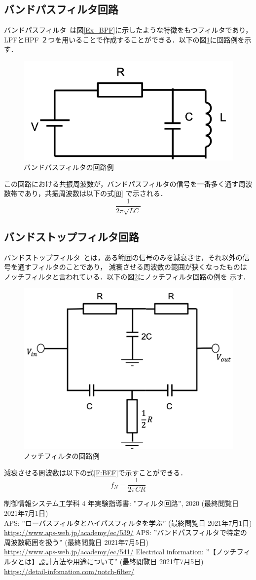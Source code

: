 \documentclass[a4paper,11pt]{jsarticle}
\begin{document}
\subsection{バンドパスフィルタ回路}
バンドパスフィルタ~\cite{BPF}は図\ref{Ex_BPF}に示したような特徴をもつフィルタであり，LPFとHPF
２つを用いることで作成することができる．以下の図\ref{C:RLC_BPF}に回路例を示す．
\begin{figure}[H]
  \centering
  \includegraphics[width=0.3\linewidth]{picture/RLC_BPF.png}
  \caption{バンドパスフィルタの回路例}
  \label{C:RLC_BPF}
\end{figure}
この回路における共振周波数が，バンドパスフィルタの信号を一番多く通す周波数帯であり，共振周波数は以下の式\ref{f0}
で示される．
\begin{equation}
  \frac{1}{2\pi\sqrt{LC}} \label{f0}
\end{equation}

\subsection{バンドストップフィルタ回路}
バンドストップフィルタ~\cite{BEF}とは，ある範囲の信号のみを減衰させ，それ以外の信号を通すフィルタのことであり，
減衰させる周波数の範囲が狭くなったものはノッチフィルタと言われている．以下の図\ref{C:BEF}にノッチフィルタ回路の例を
示す．
\begin{figure}[H]
  \centering
  \includegraphics[width=0.3\linewidth]{picture/BEF_C.png}
  \caption{ノッチフィルタの回路例}
  \label{C:BEF}
\end{figure}
減衰させる周波数は以下の式\ref{F:BEF}で示すことができる．
\begin{equation}
  f_N = \frac{1}{2\pi CR} \label{F:BEF}
\end{equation}
\begin{thebibliography}{99}
   制御情報システム工学科 4 年実験指導書: ''フィルタ回路'', 2020 (最終閲覧日 2021年7月1日)\\
   APS: ''ローパスフィルタとハイパスフィルタを学ぶ'' (最終閲覧日 2021年7月1日) \\ \url{https://www.aps-web.jp/academy/ec/539/}
   APS: ''バンドパスフィルタで特定の周波数範囲を扱う'' (最終閲覧日 2021年7月5日) \\ \url{https://www.aps-web.jp/academy/ec/541/}
   Electrical information: ''【ノッチフィルタとは】設計方法や用途について'' (最終閲覧日 2021年7月5日) \\ \url{https://detail-infomation.com/notch-filter/}
\end{thebibliography}
\end{document}
